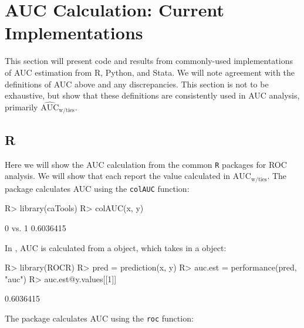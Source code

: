 \documentclass[article]{jss}
\begin{document}
\hypertarget{auc-calculation-current-implementations}{%
\section{AUC Calculation: Current
Implementations}\label{auc-calculation-current-implementations}}

This section will present code and results from commonly-used
implementations of AUC estimation from R, Python, and Stata. We will
note agreement with the definitions of AUC above and any discrepancies.
This section is not to be exhaustive, but show that these definitions
are consistently used in AUC analysis, primarily
\(\widehat{\text{AUC}}_{\text{w/ties}}\).

\hypertarget{r}{%
\subsection{R}\label{r}}

Here we will show the AUC calculation from the common \texttt{R}
packages for ROC analysis. We will show that each report the value
calculated in \(\text{AUC}_{\text{w/ties}}\). The  package
calculates AUC using the \texttt{colAUC} function:

\begin{CodeChunk}

\begin{CodeInput}
R> library(caTools)
R> colAUC(x, y)
\end{CodeInput}

\begin{CodeOutput}
             [,1]
0 vs. 1 0.6036415
\end{CodeOutput}
\end{CodeChunk}

In , AUC is calculated from a  object, which
takes in a  object:

\begin{CodeChunk}

\begin{CodeInput}
R> library(ROCR)
R> pred = prediction(x, y)
R> auc.est = performance(pred, "auc")
R> auc.est@y.values[[1]]
\end{CodeInput}

\begin{CodeOutput}
[1] 0.6036415
\end{CodeOutput}
\end{CodeChunk}

The  package calculates AUC using the \texttt{roc} function:
\end{document}
